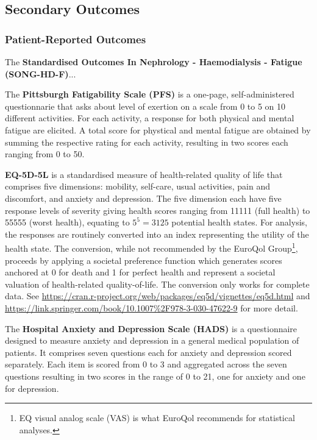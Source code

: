 \documentclass[
]{article}
\begin{document}
\hypertarget{secondary-outcomes}{
  \subsection{Secondary Outcomes}\label{secondary-outcomes}}

\hypertarget{pro-outcomes}{
  \subsubsection{Patient-Reported Outcomes}\label{pro-outcomes}}

The \textbf{Standardised Outcomes In Nephrology - Haemodialysis - Fatigue (SONG-HD-F)}...

The \textbf{Pittsburgh Fatigability Scale (PFS)} \cite{glynn2015pittsburgh} is a one-page, self-administered questionnarie that asks about level of exertion on a scale from 0 to 5 on 10 different activities.
For each activity, a response for both physical and mental fatigue are elicited.
A total score for phystical and mental fatigue are obtained by summing the respective rating for each activity, resulting in two scores each ranging from 0 to 50.

\textbf{EQ-5D-5L} is a standardised measure of health-related quality of life that comprises five dimensions: mobility, self-care, usual activities, pain and discomfort, and anxiety and depression.
The five dimension each have five response levels of severity giving health scores ranging from 11111 (full health) to 55555 (worst health), equating to $5^5 = 3125$ potential health states.
For analysis, the responses are routinely converted into an index representing the utility of the health state.
The conversion, while not recommended by the EuroQol Group\footnote{EQ visual analog scale (VAS) is what EuroQol recommends for statistical analyses.}, proceeds by applying a societal preference function which generates scores anchored at 0 for death and 1 for perfect health and represent a societal valuation of health-related quality-of-life.
The conversion only works for complete data.
See \url{https://cran.r-project.org/web/packages/eq5d/vignettes/eq5d.html} and \url{https://link.springer.com/book/10.1007\%2F978-3-030-47622-9} for more detail.


The \textbf{Hospital Anxiety and Depression Scale (HADS)} \cite{zigmond1983hospital} is a questionnaire designed to measure anxiety and depression in a general medical population of patients.
It comprises seven questions each for anxiety and depression scored separately.
Each item is scored from 0 to 3 and aggregated across the seven questions resulting in two scores in the range of 0 to 21, one for anxiety and one for depression.
\end{document}
